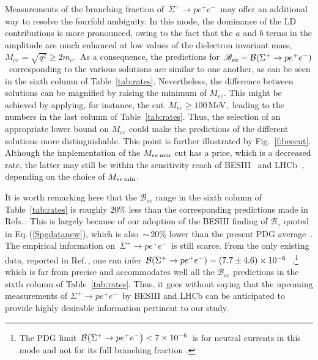 \documentclass[amsmath,amssymb,aps,nofootinbib,prd,preprint,superscriptaddress,tightenlines,a4paper,bm]{revtex4-2}
\begin{document}
Measurements of the branching fraction of \,$\Sigma^+\to p e^+e^-$\, may offer an additional way to resolve the fourfold ambiguity.
In this mode, the dominance of the LD contributions is more pronounced, owing to the fact that the $a$ and $b$ terms in the amplitude are much enhanced at low values of the dielectron invariant mass, \,$M_{ee}=\sqrt{q^2}\ge2m_e^{}$.\,
As a consequence, the predictions for \,${\mathscr B}_{ee}={\cal B}(\Sigma^+\to p e^+e^-)$\, corresponding to the various solutions are similar to one another, as can be seen in the sixth column of Table~\ref{tab:rates}.
Nevertheless, the difference between solutions can be magnified by raising the minimum of $M_{ee}$.
This might be achieved by applying, for instance, the cut \,$M_{ee}\ge 100$\,MeV,\, leading to the numbers in the last column of Table~\ref{tab:rates}.
Thus, the selection of an appropriate lower bound on $M_{ee}$ could make the predictions of the different solutions more distinguishable.
This point is further illustrated by Fig.~\ref{f:beecut}.
Although the implementation of the $M_{ee\rm\,min}$ cut has a price, which is a decreased rate, the latter may still be within the sensitivity reach of BESIII~\cite{Li:2016tlt} and LHCb~\cite{AlvesJunior:2018ldo,LHCb:2018roe,Cerri:2018ypt}, depending on the choice of $M_{ee\rm\,min}$.

It is worth remarking here that the ${\mathscr B}_{ee}$ range in the sixth column of Table~\ref{tab:rates} is roughly 20\% less than the corresponding predictions made in Refs.\,\cite{He:2005yn,He:2018yzu}.
This is largely because of our adoption of the BESIII finding of ${\mathscr B}_\gamma$ quoted in Eq.\,(\ref{Spgdatanew}), which is also \,{\small$\sim$}\,20\% lower than the present PDG average~\cite{Workman:2022ynf}.
The empirical information on \,$\Sigma^+\to pe^+e^-$\, is still scarce.
From the only existing data, reported in Ref.\,\cite{Ang:1969hg}, one can infer
\,${\cal B}(\Sigma^+\to pe^+e^-)=(7.7\pm4.6)\times10^{-6}$\,~\cite{He:2005yn},\footnote{The PDG limit \,${\cal B}\big(\Sigma^+\to pe^+e^-\big)<7\times10^{-6}$\, \cite{Workman:2022ynf} is for neutral currents in this mode and not for its full branching fraction \cite{Ang:1969hg}.}
which is far from precise and accommodates well all the ${\mathscr B}_{ee}$ predictions in the sixth column of Table~\ref{tab:rates}.
Thus, it goes without saying that the upcoming measurements of  $\Sigma^+\to p e^+e^-$\, by BESIII and LHCb can be anticipated to provide highly desirable information pertinent to our study.
\end{document}
